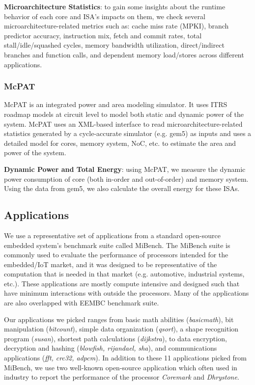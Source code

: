 \noindent \textbf{Microarchitecture Statistics}: to gain some insights about the runtime behavior of each core and ISA's impacts on them, we check several microarchitecture-related metrics such as: cache miss rate (MPKI), branch predictor accuracy, instruction mix, fetch and commit rates, total stall/idle/squashed cycles, memory bandwidth utilization, direct/indirect branches and function calls, and dependent memory load/stores across different applications. 

\subsubsection{McPAT}
McPAT is an integrated power and area modeling simulator. It uses ITRS roadmap models at circuit level to model both static and dynamic power of the system. McPAT uses an XML-based interface to read microarchitecture-related statistics generated by a cycle-accurate simulator (e.g. gem5) as inputs and uses a detailed model for cores, memory system, NoC, etc. to estimate the area and power of the system. 

\noindent \textbf{Dynamic Power and Total Energy}: using McPAT, we measure the dynamic power consumption of core (both in-order and out-of-order) and memory system. Using the data from gem5, we also calculate the overall energy for these ISAs.

\subsection{Applications}
We use a representative set of applications from a standard open-source embedded system's benchmark suite called MiBench. The MiBench suite is commonly used to evaluate the performance of processors intended for the embedded/IoT market, and it was designed to be representative of the computation that is needed in that market (e.g. automotive, industrial systems, etc.). These applications are mostly compute intensive and designed such that have minimum interactions with outside the processors. Many of the applications are also overlapped with EEMBC benchmark suite. 

Our applications we picked ranges from basic math abilities (\textit{basicmath}), bit manipulation (\textit{bitcount}), simple data organization (\textit{qsort}), a shape recognition program (\textit{susan}), shortest path calculations (\textit{dijkstra}), to data encryption, decryption and hashing (\textit{blowfish, rijandael, sha}), and communications applications (\textit{fft, crc32, adpcm}). In addition to these 11 applications picked from MiBench, we use two well-known open-source application which often used in industry to report the performance of the processor \textit{Coremark} and \textit{Dhrystone}. 

   
 
